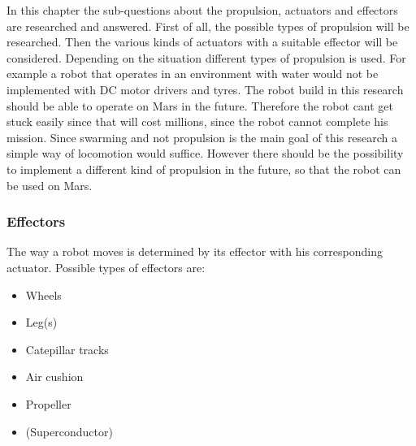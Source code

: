 \documentclass[10pt,a4paper]{article}
\begin{document}
In this chapter the sub-questions about the propulsion, actuators and effectors are researched and answered. First of all, the possible types of propulsion will be researched. Then the various kinds of actuators with a suitable effector will be considered. Depending on the situation different types of propulsion is used. For example a robot that operates in an environment with water would not be implemented with DC motor drivers and tyres. The robot build in this research should be able to operate on Mars in the future. Therefore the robot cant get stuck easily since that will cost millions, since the robot cannot complete his mission. Since swarming and not propulsion is the main goal of this research a simple way of locomotion would suffice. However there should be the possibility to implement a different kind of propulsion in the future, so that the robot can be used on Mars. 



\subsubsection{Effectors}
The way a robot moves is determined by its effector with his corresponding actuator. Possible types of effectors are:


\begin{itemize}
\item Wheels
\item Leg(s)
\item Catepillar tracks
\item Air cushion  
\item Propeller 
\item (Superconductor)
\end{itemize}
\end{document}
